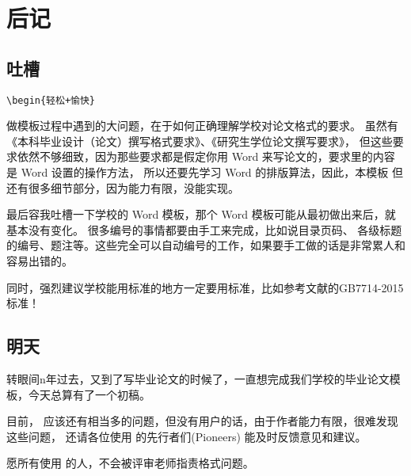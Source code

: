 \chapter{后记}

\section{吐槽}

\verb!\begin{轻松+愉快}!

做模板过程中遇到的大问题，在于如何正确理解学校对论文格式的要求。
虽然有《本科毕业设计（论文）撰写格式要求》、《研究生学位论文撰写要求》，
但这些要求依然不够细致，因为那些要求都是假定你用 Word 来写论文的，要求里的内容是 Word 设置的操作方法，
所以还要先学习 Word 的排版算法，因此，本模板
但还有很多细节部分，因为能力有限，没能实现。

最后容我吐槽一下学校的 Word 模板，那个 Word 模板可能从最初做出来后，就基本没有变化。
很多编号的事情都要由手工来完成，比如说目录页码、
各级标题的编号、题注等。这些完全可以自动编号的工作，如果要手工做的话是非常累人和容易出错的。

同时，强烈建议学校能用标准的地方一定要用标准，比如参考文献的GB7714-2015标准！

\section{明天}

转眼间n年过去，又到了写毕业论文的时候了，一直想完成我们学校的毕业论文模板，今天总算有了一个初稿。

目前， \nwafuthesis{} 应该还有相当多的问题，但没有用户的话，由于作者能力有限，很难发现这些问题，
还请各位使用 \nwafuthesis{} 的先行者们(Pioneers) 能及时反馈意见和建议。

愿所有使用 \nwafuthesis{} 的人，不会被评审老师指责格式问题。
